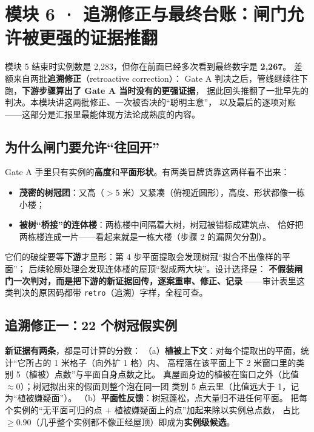 \section{模块 6 · 追溯修正与最终台账：闸门允许被更强的证据推翻}

模块 5 结束时实例数是 2{,}283，但你在前面已经多次看到最终数字是 \textbf{2{,}267}。
差额来自两批\textbf{追溯修正}（retroactive correction）：
Gate A 判决之后，管线继续往下跑，\textbf{下游步骤算出了 Gate A 当时没有的更强证据}，
据此回头推翻了一批早先的判决。本模块讲这两批修正、一次被否决的``聪明主意''，
以及最后的逐项对账——这部分是汇报里最能体现方法论成熟度的内容。

\subsection{为什么闸门要允许``往回开''}

Gate A 手里只有实例的\textbf{高度}和\textbf{平面形状}。有两类冒牌货靠这两样看不出来：

\begin{itemize}
\item \textbf{茂密的树冠团}：又高（$>$5 米）又紧凑（俯视近圆形），高度、形状都像一栋小楼；
\item \textbf{被树``桥接''的连体楼}：两栋楼中间隔着大树，树冠被错标成建筑点、
      恰好把两栋楼连成一片——看起来就是一栋大楼（步骤 2 的漏网欠分割）。
\end{itemize}

它们的破绽要等\textbf{下游}才显形：第 4 步平面提取会发现树冠``拟合不出像样的平面''；
后续轮廓处理会发现连体楼的屋顶``裂成两大块''。设计选择是：
\textbf{不假装闸门一次判对，而是把下游的新证据回传，逐案重审、修正、记录}
——审计表里这类判决的原因码都带 \texttt{retro}（追溯）字样，全程可查。

\subsection{追溯修正一：22 个树冠假实例}

\textbf{新证据有两条}，都是可计算的分数：
（a）\textbf{植被上下文}：对每个提取出的平面，统计``它所占的 1 米格子（向外扩 1 格）内、
高程落在该平面上下 2 米窗口里的类别 5（植被）点数''与平面自身点数之比。
真屋面身边的植被在窗口之外（比值 $\approx0$）；树冠拟出来的假面则整个泡在同一团
类别 5 点云里（比值远大于 1，记为``植被嫌疑面''）。
（b）\textbf{平面性反馈}：树冠蓬松，点大量归不进任何平面。
把每个实例的``无平面可归的点 $+$ 植被嫌疑面上的点''加起来除以实例总点数，
占比 $\geq 0.90$（几乎整个实例都不像正经屋顶）即成为\textbf{实例级候选}。

